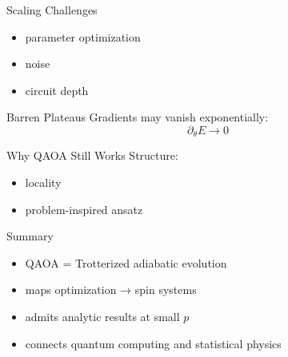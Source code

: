 \documentclass{beamer}
\begin{document}
\begin{frame}{Scaling Challenges}
\begin{itemize}
\item parameter optimization
\item noise
\item circuit depth
\end{itemize}
\end{frame}

\begin{frame}{Barren Plateaus}
Gradients may vanish exponentially:
\[
\partial_\theta E \to 0
\]
\end{frame}

\begin{frame}{Why QAOA Still Works}
Structure:
\begin{itemize}
\item locality
\item problem-inspired ansatz
\end{itemize}
\end{frame}

\begin{frame}{Summary}
\begin{itemize}
\item QAOA = Trotterized adiabatic evolution
\item maps optimization → spin systems
\item admits analytic results at small $p$
\item connects quantum computing and statistical physics
\end{itemize}
\end{frame}
\end{document}
